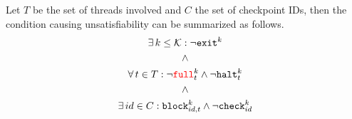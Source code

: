 {%
Let $T$ be the set of threads involved and $C$ the set of checkpoint IDs, then the condition causing unsatisfiability can be summarized as follows.
\begin{equation*}
  \begin{gathered}
  \exists \, k \leq \mathcal{K} : \lnot \texttt{exit}^k \\
  \land \\
  \forall \, t \in T : \lnot {\color{red}\texttt{full}}^k_t \land \lnot \texttt{halt}^k_t \\
  \land \\
  \exists \, id \in C : \texttt{block}^k_{id, t} \land \lnot \texttt{check}^k_{id}
  \end{gathered}
\end{equation*}
}

